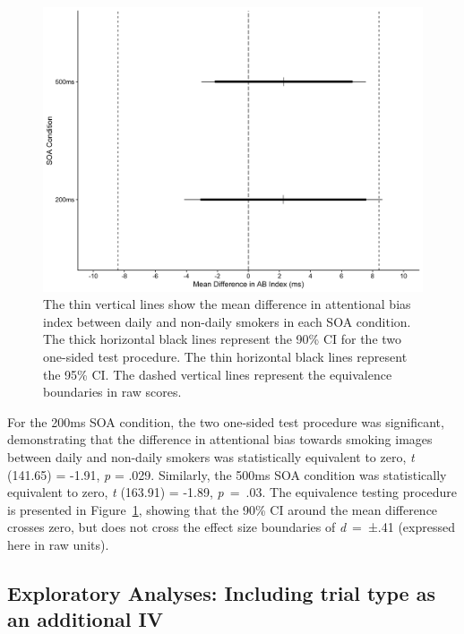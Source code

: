 \documentclass[empirical, authordate]{jote-new-article}
\begin{document}
\begin{figure}[t]


  \begin{fullwidth}

    \includegraphics[width=\linewidth]{media/image4.jpeg}
    \caption{
      The thin vertical lines show the mean difference in attentional bias index between daily and non-daily smokers in each SOA condition. The thick horizontal black lines represent the 90\% CI for the two one-sided test procedure. The thin horizontal black lines represent the 95\% CI. The dashed vertical lines represent the equivalence boundaries in raw scores.}
    \label{fig:4}

  \end{fullwidth}


\end{figure}

For the 200ms SOA condition, the two one-sided test procedure was significant, demonstrating that the difference in attentional bias towards smoking images between daily and non-daily smokers was statistically equivalent to zero, \emph{t} (141.65) = -1.91, \emph{p} = .029. Similarly, the 500ms SOA condition was statistically equivalent to zero, \emph{t} (163.91) = -1.89, \emph{p}~=~.03. The equivalence testing procedure is presented in Figure~\ref{fig:4}, showing that the 90\% CI around the mean difference crosses zero, but does not cross the effect size boundaries of \emph{d}~=~±.41 (expressed here in raw units).






\subsection{Exploratory Analyses: Including trial type as an additional IV}
\end{document}
